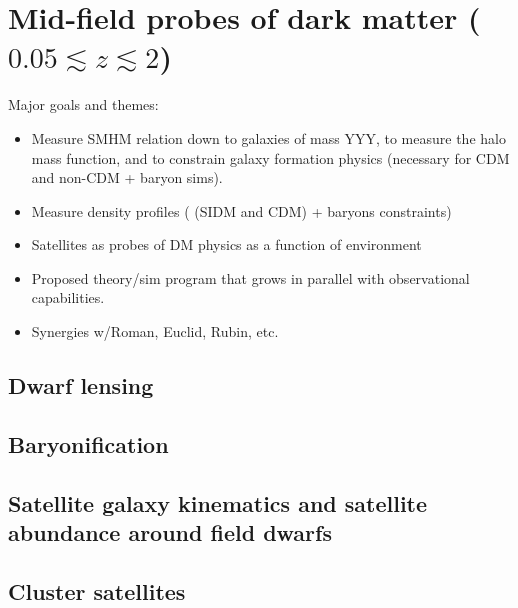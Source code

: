 \chapter*{Mid-field probes of dark matter ($0.05\lesssim z \lesssim 2$)}

Major goals and themes:
\begin{itemize}
	\item Measure SMHM relation down to galaxies of mass YYY, to measure the halo mass function, and to constrain galaxy formation physics (necessary for CDM and non-CDM + baryon sims).
	\item Measure density profiles ( (SIDM and CDM) + baryons constraints)
	\item Satellites as probes of DM physics as a function of environment
	\item Proposed theory/sim program that grows in parallel with observational capabilities.
	\item Synergies w/Roman, Euclid, Rubin, etc.
\end{itemize}

\section{Dwarf lensing}

\section{Baryonification}

\section{Satellite galaxy kinematics and satellite abundance around field dwarfs}

\section{Cluster satellites}





